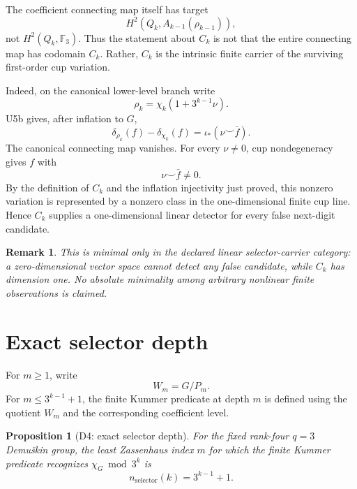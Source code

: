 \documentclass[11pt]{article}
\newtheorem{proposition}[theorem]{Proposition}
\newtheorem{remark}[theorem]{Remark}
\begin{document}
The coefficient connecting map itself has target
\[
H^2(Q_k,A_{k-1}(\rho_{k-1})),
\]
not $H^2(Q_k,\mathbb F_3)$. Thus the statement about $C_k$ is not that the
entire connecting map has codomain $C_k$. Rather, $C_k$ is the intrinsic
finite carrier of the surviving first-order cup variation.

Indeed, on the canonical lower-level branch write
\[
\rho_k=\chi_k(1+3^{k-1}\nu).
\]
U5b gives, after inflation to $G$,
\[
\delta_{\rho_k}(f)-\delta_{\chi_k}(f)
=
\iota_*(\nu\smile\bar f).
\]
The canonical connecting map vanishes. For every $\nu\ne0$, cup
nondegeneracy gives $f$ with
\[
\nu\smile\bar f\ne0.
\]
By the definition of $C_k$ and the inflation injectivity just proved,
this nonzero variation is represented by a nonzero class in the
one-dimensional finite cup line. Hence $C_k$ supplies a one-dimensional
linear detector for every false next-digit candidate.

\begin{remark}
This is minimal only in the declared linear selector-carrier category:
a zero-dimensional vector space cannot detect any false candidate, while
$C_k$ has dimension one. No absolute minimality among arbitrary nonlinear
finite observations is claimed.
\end{remark}

\section{Exact selector depth}

For $m\ge1$, write
\[
W_m=G/P_m.
\]
For $m\le3^{k-1}+1$, the finite Kummer predicate at depth $m$ is defined
using the quotient $W_m$ and the corresponding coefficient level.

\begin{proposition}[D4: exact selector depth]
For the fixed rank-four $q=3$ Demu\v{s}kin group, the least Zassenhaus
index $m$ for which the finite Kummer predicate recognizes
$\chi_G\bmod3^k$ is
\[
\boxed{
n_{\mathrm{selector}}(k)=3^{k-1}+1.
}
\]
\end{proposition}
\end{document}
